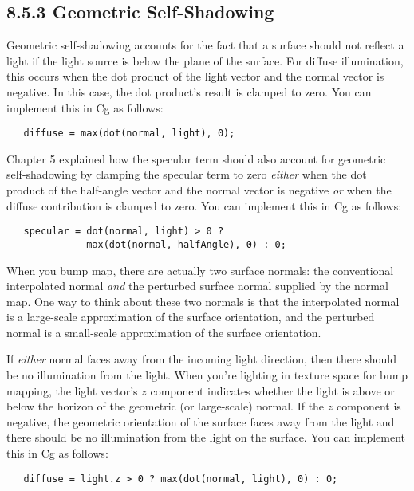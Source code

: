 \documentclass[../main.tex]{subfiles}
\begin{document}
\subsection{8.5.3 Geometric Self-Shadowing}

Geometric self-shadowing accounts for the fact that a surface should not reflect a light if the light source is below the plane of the surface. For diffuse illumination, this occurs when the dot product of the light vector and the normal vector is negative. In this case, the dot product's result is clamped to zero. You can implement this in Cg as follows:

\FloatBarrier
\begin{lstlisting}
   diffuse = max(dot(normal, light), 0);
\end{lstlisting}
\FloatBarrier

Chapter 5 explained how the specular term should also account for geometric self-shadowing by clamping the specular term to zero \textit{either} when the dot product of the half-angle vector and the normal vector is negative \textit{or} when the diffuse contribution is clamped to zero. You can implement this in Cg as follows:

\FloatBarrier
\begin{lstlisting}
   specular = dot(normal, light) > 0 ?
              max(dot(normal, halfAngle), 0) : 0;
\end{lstlisting}
\FloatBarrier

When you bump map, there are actually two surface normals: the conventional interpolated normal \textit{and} the perturbed surface normal supplied by the normal map. One way to think about these two normals is that the interpolated normal is a large-scale approximation of the surface orientation, and the perturbed normal is a small-scale approximation of the surface orientation.

If \textit{either} normal faces away from the incoming light direction, then there should be no illumination from the light. When you're lighting in texture space for bump mapping, the light vector's $z$ component indicates whether the light is above or below the horizon of the geometric (or large-scale) normal. If the $z$ component is negative, the geometric orientation of the surface faces away from the light and there should be no illumination from the light on the surface. You can implement this in Cg as follows:

\FloatBarrier
\begin{lstlisting}
   diffuse = light.z > 0 ? max(dot(normal, light), 0) : 0;
\end{lstlisting}
\FloatBarrier
\end{document}
